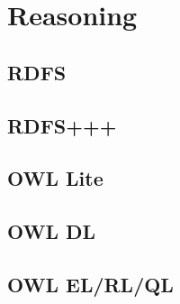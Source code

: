 \chapter{Reasoning}

\section{RDFS}

\section{RDFS+++}

\section{OWL Lite}

\section{OWL DL}

\section{OWL EL/RL/QL}
